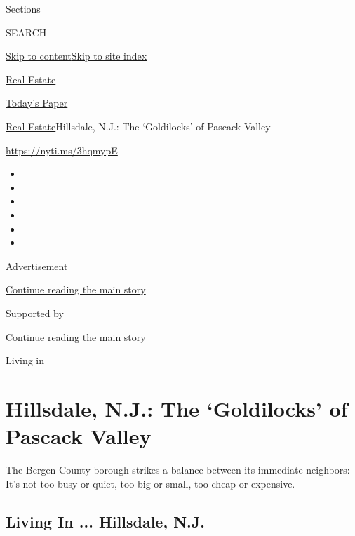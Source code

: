 Sections

SEARCH

\protect\hyperlink{site-content}{Skip to
content}\protect\hyperlink{site-index}{Skip to site index}

\href{https://www.nytimes3xbfgragh.onion/section/realestate}{Real
Estate}

\href{https://myaccount.nytimes3xbfgragh.onion/auth/login?response_type=cookie\&client_id=vi}{}

\href{https://www.nytimes3xbfgragh.onion/section/todayspaper}{Today's
Paper}

\href{/section/realestate}{Real Estate}\textbar{}Hillsdale, N.J.: The
`Goldilocks' of Pascack Valley

\url{https://nyti.ms/3hqmypE}

\begin{itemize}
\item
\item
\item
\item
\item
\item
\end{itemize}

Advertisement

\protect\hyperlink{after-top}{Continue reading the main story}

Supported by

\protect\hyperlink{after-sponsor}{Continue reading the main story}

Living in

\hypertarget{hillsdale-nj-the-goldilocks-of-pascack-valley}{%
\section{Hillsdale, N.J.: The `Goldilocks' of Pascack
Valley}\label{hillsdale-nj-the-goldilocks-of-pascack-valley}}

The Bergen County borough strikes a balance between its immediate
neighbors: It's not too busy or quiet, too big or small, too cheap or
expensive.

\href{https://www.nytimes3xbfgragh.onion/slideshow/2020/07/22/realestate/living-in-hillsdale-nj.html}{}

\hypertarget{living-in--hillsdale-nj}{%
\subsection{Living In ... Hillsdale,
N.J.}\label{living-in--hillsdale-nj}}

